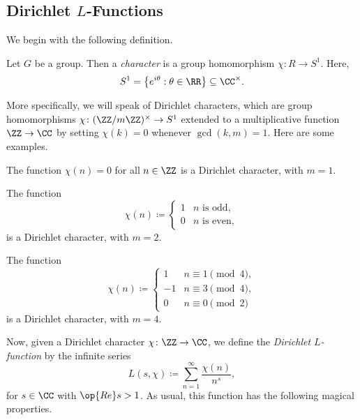 \documentclass{article}
\begin{document}
\subsection{Dirichlet \texorpdfstring{$L$}{ L}-Functions}
We begin with the following definition.
\begin{definition}[Character]
	Let $G$ be a group. Then a \textit{character} is a group homomorphism $\chi\colon R\to S^1$. Here,
	\[S^1=\left\{e^{i\theta}:\theta\in\RR\right\}\subseteq\CC^\times.\]
\end{definition}
More specifically, we will speak of Dirichlet characters, which are group homomorphisms $\chi\colon(\ZZ/m\ZZ)^\times\to S^1$ extended to a multiplicative function $\ZZ\to\CC$ by setting $\chi(k)=0$ whenever $\gcd(k,m)=1$. Here are some examples.
\begin{example}
	The function $\chi(n)=0$ for all $n\in\ZZ$ is a Dirichlet character, with $m=1$.
\end{example}
\begin{example}
	The function
	\[\chi(n)\coloneqq\begin{cases}
		1 & n\text{ is odd}, \\
		0 & n\text{ is even},
	\end{cases}\]
	is a Dirichlet character, with $m=2$.
\end{example}
\begin{example}
	The function
	\[\chi(n)\coloneqq\begin{cases}
		1 & n\equiv1\pmod4, \\
		-1 & n\equiv3\pmod4, \\
		0 & n\equiv0\pmod2
	\end{cases}\]
	is a Dirichlet character, with $m=4$.
\end{example}
Now, given a Dirichlet character $\chi\colon\ZZ\to\CC$, we define the \textit{Dirichlet $L$-function} by the infinite series
\begin{equation}
	L(s,\chi)\coloneqq\sum_{n=1}^\infty\frac{\chi(n)}{n^s}, \label{eq:lfuncseries}
\end{equation}
for $s\in\CC$ with $\op{Re}s>1$. As usual, this function has the following magical properties.
\end{document}
